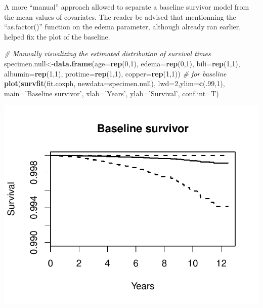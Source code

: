\documentclass[]{article}
\newenvironment{Shaded}{\begin{snugshade}}{\end{snugshade}}
\newcommand{\KeywordTok}[1]{\textcolor[rgb]{0.13,0.29,0.53}{\textbf{#1}}}
\newcommand{\DataTypeTok}[1]{\textcolor[rgb]{0.13,0.29,0.53}{#1}}
\newcommand{\DecValTok}[1]{\textcolor[rgb]{0.00,0.00,0.81}{#1}}
\newcommand{\StringTok}[1]{\textcolor[rgb]{0.31,0.60,0.02}{#1}}
\newcommand{\CommentTok}[1]{\textcolor[rgb]{0.56,0.35,0.01}{\textit{#1}}}
\newcommand{\NormalTok}[1]{#1}
\begin{document}
A more ``manual'' approach allowed to separate a baseline survivor model
from the mean values of covariates. The reader be advised that
mentionning the ``as.factor()'' function on the edema parameter,
although already ran earlier, helped fix the plot of the baseline.

\begin{Shaded}
\begin{Highlighting}[]
\CommentTok{# Manually visualizing the estimated distribution of survival times}
\NormalTok{specimen.null<-}\KeywordTok{data.frame}\NormalTok{(}\DataTypeTok{age=}\KeywordTok{rep}\NormalTok{(}\DecValTok{0}\NormalTok{,}\DecValTok{1}\NormalTok{), }\DataTypeTok{edema=}\KeywordTok{rep}\NormalTok{(}\DecValTok{0}\NormalTok{,}\DecValTok{1}\NormalTok{), }\DataTypeTok{bili=}\KeywordTok{rep}\NormalTok{(}\DecValTok{1}\NormalTok{,}\DecValTok{1}\NormalTok{), }\DataTypeTok{albumin=}\KeywordTok{rep}\NormalTok{(}\DecValTok{1}\NormalTok{,}\DecValTok{1}\NormalTok{), }
                          \DataTypeTok{protime=}\KeywordTok{rep}\NormalTok{(}\DecValTok{1}\NormalTok{,}\DecValTok{1}\NormalTok{), }\DataTypeTok{copper=}\KeywordTok{rep}\NormalTok{(}\DecValTok{1}\NormalTok{,}\DecValTok{1}\NormalTok{))}
\CommentTok{# for baseline}
\KeywordTok{plot}\NormalTok{(}\KeywordTok{survfit}\NormalTok{(fit.coxph, }\DataTypeTok{newdata=}\NormalTok{specimen.null), }\DataTypeTok{lwd=}\DecValTok{2}\NormalTok{,}\DataTypeTok{ylim=}\KeywordTok{c}\NormalTok{(.}\DecValTok{99}\NormalTok{,}\DecValTok{1}\NormalTok{),}
     \DataTypeTok{main=}\StringTok{'Baseline survivor'}\NormalTok{, }\DataTypeTok{xlab=}\StringTok{'Years'}\NormalTok{, }\DataTypeTok{ylab=}\StringTok{'Survival'}\NormalTok{, }\DataTypeTok{conf.int=}\NormalTok{T)}
\end{Highlighting}
\end{Shaded}

\includegraphics{survival_pbc_files/figure-latex/unnamed-chunk-35-1.pdf}
\end{document}
